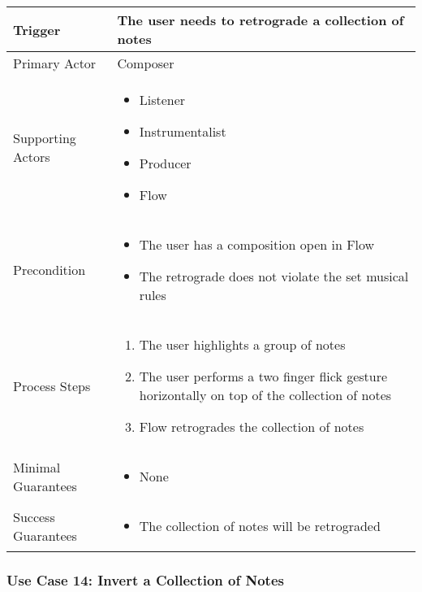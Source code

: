   \begin{tabularx}{\textwidth}{|X|X|}
  \hline
  Trigger & 
  The user needs to retrograde a collection of notes \\
  \hline
  Primary Actor & 
  Composer \\
  \hline
  Supporting Actors & 
  \begin{itemize}
  \item Listener
  \item Instrumentalist
  \item Producer
  \item Flow
  \end{itemize} \\
  \hline
  Precondition & 
  \begin{itemize}
  \item The user has a composition open in Flow
  \item The retrograde does not violate the set musical rules
  \end{itemize} \\
  \hline
  Process Steps & 
  \begin{enumerate}
  \item The user highlights a group of notes
  \item The user performs a two finger flick gesture horizontally on top of the collection of notes
  \item Flow retrogrades the collection of notes
  \end{enumerate} \\
  \hline
  Minimal Guarantees & 
  \begin{itemize}
    \item None
  \end{itemize} \\
  \hline
  Success Guarantees & 
  \begin{itemize}
    \item The collection of notes will be retrograded
  \end{itemize} \\
  \hline
  \end{tabularx}

  \subsubsection{Use Case 14: Invert a Collection of Notes}

